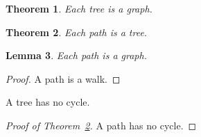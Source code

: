 \documentclass{article}
\newtheorem{theorem}{Theorem}
\newtheorem{lemma}[theorem]{Lemma}
\newcommand{\refmt}[1]{Theorem~\ref{mt:#1}}
\begin{document}
\begin{theorem}\label{T2} Each tree is a graph. \end{theorem}
\begin{theorem}\label{mt:small} Each path is a tree. \end{theorem}
\begin{lemma} Each path is a graph. \end{lemma}
\begin{proof} A path is a walk. \end{proof}

A tree has no cycle.

\begin{proof}[Proof of \refmt{small}] A path has no cycle. \end{proof}
\end{document}
